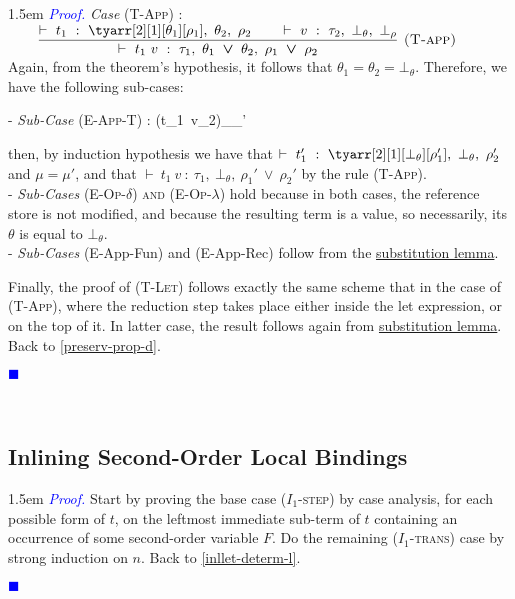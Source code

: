\documentclass[a4paper,11pt,oneside]{article}
\theoremstyle{plain}
\newtheorem{lemma}[definition]{Lemma}
\renewenvironment{proof}{\noindent \begin{adjustwidth}{1.5em}{} \textcolor{blue}{\textit{Proof.}}}
{{\begin{tiny}\textcolor{blue}{$\blacksquare$}\end{tiny}}
\end{adjustwidth}~\\\noindent}
\newcommand{\bwedge}{\boldsymbol{~\wedge~}}
\newcommand{\bvee}{\boldsymbol{~\vee~}}
\newcommand{\brarr}{\boldsymbol{~\Rightarrow~}}
\newcommand{\typing}[4]{\vdash~#1~:~#2,~#3,~#4}
\newcommand{\bth}{\bot_\theta}
\newcommand{\brh}{\bot_\rho}
\newcommand{\hookdownarrow}{\mathrel{\rotatebox[origin=c]{180}{$\hookleftarrow$}}}
\newcommand{\inlletarr}{\hookdownarrow}
\newcommand{\inlletstar}{\hookdownarrow^{\star}}
\newcommand{\inlletplus}{\inlletstar}
\newcommand{\mem}{_{\mu}}\newcommand{\memp}{_{\mu'}}
\begin{document}
\begin{proof}
   \noindent\textit{Case} \textsc{(T-App)} : $\qquad \dfrac
	{
		\typing{t_1}{\tyarr[2][1][\theta_1][\rho_1]}{\theta_2}{\rho_2} \qquad
		\typing{v}{\tau_2}{\bth}{\brh}}
	{
		\typing{t_1~v}{\tau_1}{\theta_1 \bvee \theta_2}{\rho_1 \bvee \rho_2}}
	{
		\textsc{  (T-app)}} $ \\
		
Again, from the theorem's hypothesis, it follows that $\theta_1 = \theta_2 = \bth$.
Therefore, we have the following sub-cases: 

- \textit{Sub-Case} \textsc{(E-App-T)} :
 \infrule[E-App-T]	
	{{t_{1}}\mem \rightarrow {{t'}_{1}}\memp}
	{{(t_{1}~v_2)}\mem {}\memp}
	
then, by induction hypothesis we have that $\typing{t'_1}{\tyarr[2][1][\bth][\rho_1']}{\bth}{\rho_2'}$ and $\mu = \mu'$, and that $\typing{t_1~v}{\tau_1}{\bth}{\rho_1' \bvee \rho_2'}$ by the rule \textsc{(T-App)}. \\

- \textit{Sub-Cases}	\textsc{(E-Op-$\delta$) and (E-Op-$\lambda$)} hold because in both cases, the reference store is not modified, and because the resulting term is a value, so necessarily, its $\theta$ is equal to $\bth$. \\
		
- \textit{Sub-Cases} (E-App-Fun) and  (E-App-Rec) follow from the \hyperlink{subst-lemma}{substitution lemma}.

Finally, the proof of \textsc{(T-Let)} follows exactly the same scheme that in the case of \textsc{(T-App)}, where the reduction step takes place either inside the let expression, or on the top of it.
 In latter case, the result follows again from \hyperlink{subst-lemma}{substitution lemma}. Back to \ref{preserv-prop-d}.
\end{proof}  	

	\subsection{Inlining Second-Order Local Bindings}
	


\begin{proof}
Start by proving the base case (\textsc{$I_1$-step}) by case analysis, for each possible form of $t$, on the leftmost immediate sub-term of $t$ containing an occurrence of some second-order variable $F$. 
	  Do the remaining  (\textsc{$I_1$-trans}) case	by strong induction on $n$.  Back to \ref{inllet-determ-l}.
\end{proof}	
	
\end{document}
